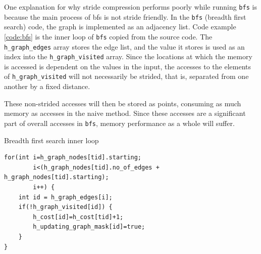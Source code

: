 \documentclass[12pt,twoside]{reedthesis}
\newenvironment{codeexample}[1][htb]
{\floatname{algorithm}{Code Example}%
	\begin{algorithm}[#1]%
	}{\end{algorithm}}
\begin{document}
%		
%		

		
		One explanation for why stride compression performs poorly while running \texttt{bfs} is because the main process of bfs is not stride friendly. In the \texttt{bfs} (breadth first search) code, the graph is implemented as an adjacency list. 
		Code example \ref{code:bfs} is the inner loop of \texttt{bfs} copied from the source code. The \texttt{h\_graph\_edges} array stores the edge list, and the value it stores is used as an index into the \texttt{h\_graph\_visited} array. Since the locations at which the memory is accessed is dependent on the values in the input, the accesses to the elements of \texttt{h\_graph\_visited} will not necessarily be strided, that is, separated from one another by a fixed distance. 
		
		These non-strided accesses will then be stored as points, consuming as much memory as accesses in the naive method. Since these accesses are a significant part of overall accesses in \texttt{bfs}, memory performance as a whole will suffer. 
		
\begin{codeexample}
	\caption{Breadth first search inner loop}
	\label{code:bfs}
		\begin{verbatim}
for(int i=h_graph_nodes[tid].starting; 
        i<(h_graph_nodes[tid].no_of_edges + h_graph_nodes[tid].starting); 
        i++) {
    int id = h_graph_edges[i];
    if(!h_graph_visited[id]) {
        h_cost[id]=h_cost[tid]+1;
        h_updating_graph_mask[id]=true;
    }
}
		\end{verbatim}
	\end{codeexample}
		
\end{document}
